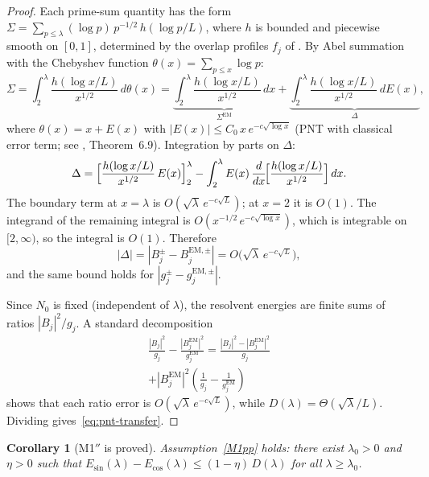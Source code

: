 \documentclass[12pt,a4paper]{article}
\newtheorem{corollary}[theorem]{Corollary}
\theoremstyle{definition}
\theoremstyle{remark}
\begin{document}
\begin{proof}
Each prime-sum quantity has the form $\Sigma = \sum_{p \leq \lambda} (\log p)\,p^{-1/2}\,h(\log p/L)$, where $h$ is bounded and piecewise smooth on $[0,1]$, determined by the overlap profiles $f_j$ of . By Abel summation with the Chebyshev function $\theta(x) = \sum_{p \leq x} \log p$:
\[
  \Sigma = \int_2^{\lambda} \frac{h(\log x/L)}{x^{1/2}}\,d\theta(x)
  = \underbrace{\int_2^{\lambda} \frac{h(\log x/L)}{x^{1/2}}\,dx}_{\Sigma^{\mathrm{EM}}}
  + \underbrace{\int_2^{\lambda} \frac{h(\log x/L)}{x^{1/2}}\,dE(x)}_{\Delta},
\]
where $\theta(x) = x + E(x)$ with $|E(x)| \leq C_0\,x\,e^{-c\sqrt{\log x}}$ (PNT with classical error term; see \cite{IwaniecKowalski2004}, Theorem~6.9). Integration by parts on $\Delta$:
\[
  \Delta = \Bigl[\frac{h(\log x/L)}{x^{1/2}}\,E(x)\Bigr]_2^{\lambda}
  - \int_2^{\lambda} E(x)\,\frac{d}{dx}\!\Bigl[\frac{h(\log x/L)}{x^{1/2}}\Bigr]\,dx.
\]
The boundary term at $x = \lambda$ is $O(\sqrt{\lambda}\,e^{-c\sqrt{L}})$; at $x = 2$ it is $O(1)$. The integrand of the remaining integral is $O(x^{-1/2}\,e^{-c\sqrt{\log x}})$, which is integrable on $[2,\infty)$, so the integral is $O(1)$. Therefore
\begin{equation}
\label{eq:pnt-error}
  |\Delta| = |B_j^{\pm} - B_j^{\mathrm{EM},\pm}| = O\!\bigl(\sqrt{\lambda}\,e^{-c\sqrt{L}}\bigr),
\end{equation}
and the same bound holds for $|g_j^{\pm} - g_j^{\mathrm{EM},\pm}|$.

Since $N_0$ is fixed (independent of $\lambda$), the resolvent energies are finite sums of ratios $|B_j|^2/g_j$. A standard decomposition
\begin{multline*}
  \frac{|B_j|^2}{g_j} - \frac{|B_j^{\mathrm{EM}}|^2}{g_j^{\mathrm{EM}}}
  = \frac{|B_j|^2 - |B_j^{\mathrm{EM}}|^2}{g_j} \\
  + |B_j^{\mathrm{EM}}|^2\!\left(\frac{1}{g_j} - \frac{1}{g_j^{\mathrm{EM}}}\right)
\end{multline*}
shows that each ratio error is $O(\sqrt{\lambda}\,e^{-c\sqrt{L}})$, while $D(\lambda) = \Theta(\sqrt{\lambda}/L)$. Dividing gives~\eqref{eq:pnt-transfer}.
\end{proof}

\begin{corollary}[M1$''$ is proved]
\label{cor:M1-proved}
Assumption~\ref{M1pp} holds: there exist $\lambda_0 > 0$ and $\eta > 0$ such that $E_{\sin}(\lambda) - E_{\cos}(\lambda) \leq (1-\eta)\,D(\lambda)$ for all $\lambda \geq \lambda_0$.
\end{corollary}
\end{document}
